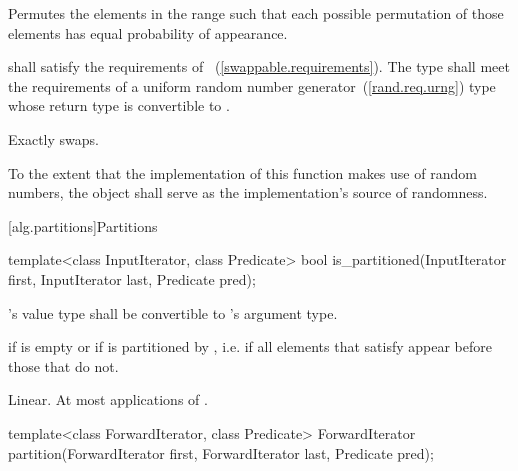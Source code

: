 \begin{itemdescr}
\pnum
\effects
Permutes the elements in the range
such that each possible permutation of those elements has equal probability of appearance.

\pnum
\requires
{} shall satisfy the requirements of
~(\ref{swappable.requirements}).
The type
 shall meet the requirements of a uniform
random number generator~(\ref{rand.req.urng}) type whose return type is
convertible to
.

\pnum
\complexity
Exactly
swaps.

\pnum
\notes
To the extent that the implementation of this function makes use of random
numbers, the object  shall serve as the implementation's source of
randomness.

\end{itemdescr}

[alg.partitions]{Partitions}

%
\begin{itemdecl}
template<class InputIterator, class Predicate>
  bool is_partitioned(InputIterator first, InputIterator last, Predicate pred);
\end{itemdecl}

\begin{itemdescr}
\pnum
\requires {}'s value type shall be convertible to 's argument type.

\pnum
\returns {} if
 is empty or if
 is partitioned by , i.e. if all elements that satisfy  appear before those that do not.

\pnum
\complexity Linear. At most  applications of .
\end{itemdescr}

%
\begin{itemdecl}
template<class ForwardIterator, class Predicate>
  ForwardIterator
    partition(ForwardIterator first,
              ForwardIterator last, Predicate pred);
\end{itemdecl}

